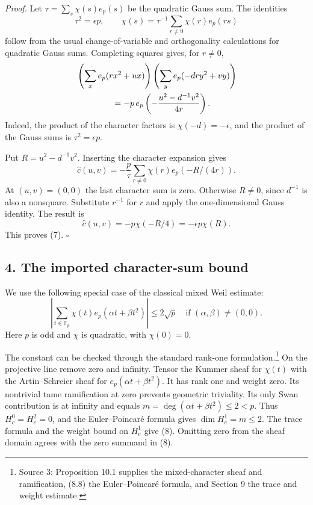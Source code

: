 \documentclass[
  11pt,
]{article}
\begin{document}
\emph{Proof.} Let \(\tau=\sum_s\chi(s)e_p(s)\) be the quadratic Gauss
sum. The identities \[
\tau^2=\epsilon p,\qquad
\chi(s)=\tau^{-1}\sum_{r\ne0}\chi(r)e_p(rs)
\] follow from the usual change-of-variable and orthogonality
calculations for quadratic Gauss sums. Completing squares gives, for
\(r\ne0\), \[
\begin{aligned}
&\left(\sum_x e_p(rx^2+ux)\right)
\left(\sum_y e_p(-dry^2+vy)\right)\\
&\hspace{15mm}=-p\,e_p\left(-\frac{u^2-d^{-1}v^2}{4r}\right).
\end{aligned}
\] Indeed, the product of the character factors is
\(\chi(-d)=-\epsilon\), and the product of the Gauss sums is
\(\tau^2=\epsilon p\).

Put \(R=u^2-d^{-1}v^2\). Inserting the character expansion gives \[
\widehat c(u,v)=-\frac p\tau\sum_{r\ne0}\chi(r)e_p(-R/(4r)).
\] At \((u,v)=(0,0)\) the last character sum is zero. Otherwise
\(R\ne0\), since \(d^{-1}\) is also a nonsquare. Substitute \(r^{-1}\)
for \(r\) and apply the one-dimensional Gauss identity. The result is \[
\widehat c(u,v)=-p\chi(-R/4)=-\epsilon p\chi(R).
\] This proves (7). \(\square\)

\subsection{4. The imported character-sum
bound}\label{the-imported-character-sum-bound}

We use the following special case of the classical mixed Weil estimate:
\[
\left|\sum_{t\in\mathbb F_p}\chi(t)e_p(\alpha t+\beta t^2)\right|
\leq2\sqrt p
\quad\text{if }(\alpha,\beta)\ne(0,0). \tag{8}
\] Here \(p\) is odd and \(\chi\) is quadratic, with \(\chi(0)=0\).

The constant can be checked through the standard rank-one
formulation.\footnote{Source 3: Proposition 10.1 supplies the
  mixed-character sheaf and ramification, (8.8) the Euler--Poincaré
  formula, and Section 9 the trace and weight estimate.} On the
projective line remove zero and infinity. Tensor the Kummer sheaf for
\(\chi(t)\) with the Artin--Schreier sheaf for
\(e_p(\alpha t+\beta t^2)\). It has rank one and weight zero. Its
nontrivial tame ramification at zero prevents geometric triviality. Its
only Swan contribution is at infinity and equals
\(m=\deg(\alpha t+\beta t^2)\leq2<p\). Thus \(H_c^0=H_c^2=0\), and the
Euler--Poincaré formula gives \(\dim H_c^1=m\leq2\). The trace formula
and the weight bound on \(H_c^1\) give (8). Omitting zero from the sheaf
domain agrees with the zero summand in (8).
\end{document}
